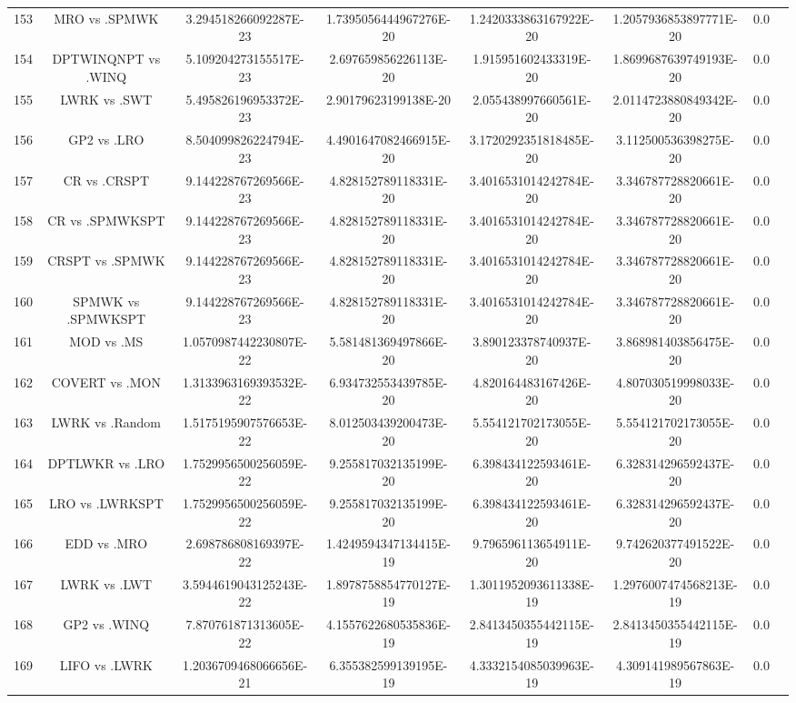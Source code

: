 \documentclass[a3paper,10pt]{article}
\begin{document}
\begin{table}[!htp]
\begin{tabular}{cccccccc}
153&MRO vs .SPMWK&3.294518266092287E-23&1.7395056444967276E-20&1.2420333863167922E-20&1.2057936853897771E-20&0.0\\
154&DPTWINQNPT vs .WINQ&5.109204273155517E-23&2.697659856226113E-20&1.915951602433319E-20&1.8699687639749193E-20&0.0\\
155&LWRK vs .SWT&5.495826196953372E-23&2.90179623199138E-20&2.055438997660561E-20&2.0114723880849342E-20&0.0\\
156&GP2 vs .LRO&8.504099826224794E-23&4.4901647082466915E-20&3.1720292351818485E-20&3.112500536398275E-20&0.0\\
157&CR vs .CRSPT&9.144228767269566E-23&4.828152789118331E-20&3.4016531014242784E-20&3.346787728820661E-20&0.0\\
158&CR vs .SPMWKSPT&9.144228767269566E-23&4.828152789118331E-20&3.4016531014242784E-20&3.346787728820661E-20&0.0\\
159&CRSPT vs .SPMWK&9.144228767269566E-23&4.828152789118331E-20&3.4016531014242784E-20&3.346787728820661E-20&0.0\\
160&SPMWK vs .SPMWKSPT&9.144228767269566E-23&4.828152789118331E-20&3.4016531014242784E-20&3.346787728820661E-20&0.0\\
161&MOD vs .MS&1.0570987442230807E-22&5.581481369497866E-20&3.890123378740937E-20&3.868981403856475E-20&0.0\\
162&COVERT vs .MON&1.3133963169393532E-22&6.934732553439785E-20&4.820164483167426E-20&4.807030519998033E-20&0.0\\
163&LWRK vs .Random&1.5175195907576653E-22&8.012503439200473E-20&5.554121702173055E-20&5.554121702173055E-20&0.0\\
164&DPTLWKR vs .LRO&1.7529956500256059E-22&9.255817032135199E-20&6.398434122593461E-20&6.328314296592437E-20&0.0\\
165&LRO vs .LWRKSPT&1.7529956500256059E-22&9.255817032135199E-20&6.398434122593461E-20&6.328314296592437E-20&0.0\\
166&EDD vs .MRO&2.698786808169397E-22&1.4249594347134415E-19&9.796596113654911E-20&9.742620377491522E-20&0.0\\
167&LWRK vs .LWT&3.5944619043125243E-22&1.8978758854770127E-19&1.3011952093611338E-19&1.2976007474568213E-19&0.0\\
168&GP2 vs .WINQ&7.870761871313605E-22&4.1557622680535836E-19&2.8413450355442115E-19&2.8413450355442115E-19&0.0\\
169&LIFO vs .LWRK&1.2036709468066656E-21&6.355382599139195E-19&4.3332154085039963E-19&4.309141989567863E-19&0.0\\

\end{tabular}
\end{table}
\end{document}
